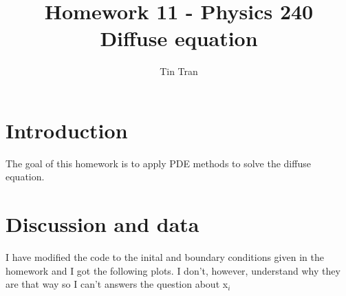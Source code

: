 \documentclass{article}
\begin{document}
\title{Homework 11 - Physics 240\\
		Diffuse equation}
\author{Tin Tran}

\maketitle

\section{Introduction}
The goal of this homework is to apply PDE methods to solve the diffuse equation.

\section{Discussion and data}
I have modified the code to the inital and boundary conditions given in the homework and I got the following plots. I don't, however, understand why they are that way so I can't answers the question about x$_i$

\begin{figure}[H]
\end{figure}

\begin{figure}[H]
\end{figure}
\end{document}

